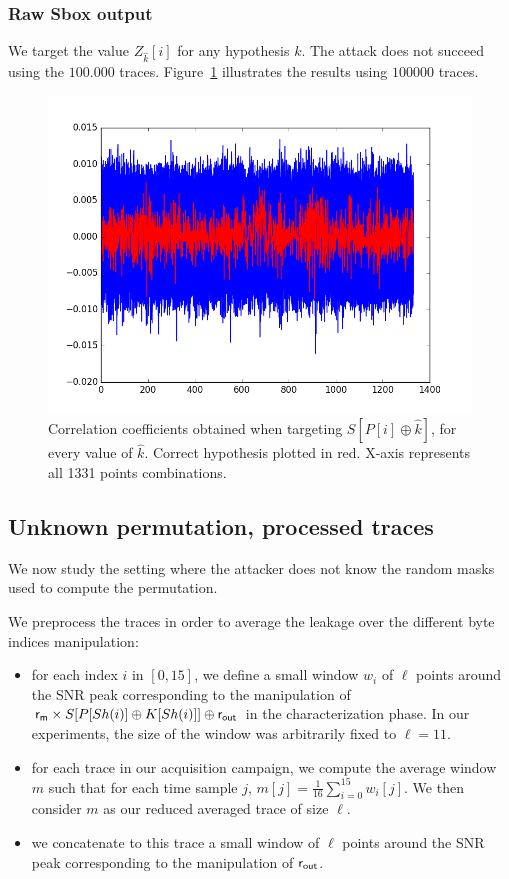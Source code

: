 \subsubsection{Raw Sbox output}
We target the value $Z_{\hat{k}}[i]$ for any hypothesis $k$.
The attack does not succeed using the $100.000$ traces.
Figure~\ref{fig:CPA3O_trickedZ1} illustrates the results using $100000$ traces.
\begin{figure}[H]
	\centering 
	\includegraphics[scale=0.35]{figures/CPA3O_trickedZ1.png}
	\caption{Correlation coefficients obtained when targeting $S[P[i]\oplus \hat{k}] $, for every value of $\hat{k}$. Correct hypothesis plotted in red. X-axis represents all 1331 points combinations.}
	\label{fig:CPA3O_trickedZ1}
\end{figure}

\subsection{Unknown permutation, processed traces}
We now study the setting where the attacker does not know the random masks used to compute the permutation.

We preprocess the traces in order to average the leakage over the different byte indices manipulation:
\begin{itemize}
	\item for each index $i$ in $[0,15]$, we define a small window $w_i$ of $\ell$ points around the SNR peak corresponding to the manipulation of $\mathsf{r_m} \times S[P[Sh(i)] \oplus K[Sh(i)]]\oplus \mathsf{r_{out}}$ in the characterization phase. In our experiments, the size of the window was arbitrarily fixed to $\ell=11$.
	\item for each trace in our acquisition campaign, we compute the average window $m$ such that for each time sample $j$, $m[j]=\frac{1}{16}\sum_{i=0}^{15} w_i[j]$. We then consider $m$ as our reduced averaged trace of size $\ell$.
	\item we concatenate to this trace a small window of $\ell$ points around the SNR peak corresponding to the manipulation of $\mathsf{r_{out}}$.
\end{itemize}


